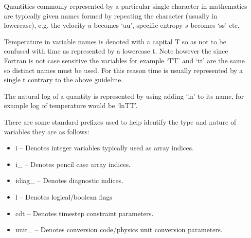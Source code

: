 \documentclass[\mydriver,12pt,twoside,notitlepage,a4paper]{article}
\begin{document}
Quantities commonly represented by a particular single character
in mathematics are typically given names formed by repeating the
character (usually in lowercase), e.g. the velocity $u$ becomes `uu',
specific entropy $s$ becomes `ss' etc.

Temperature in variable names is denoted with a capital T so as not to
be confused with time as represented by a lowercase t.  Note however the
since Fortran is not case sensitive the variables for example `TT' and
`tt' are the same so distinct names must be used. For this reason time is
usually represented by a single t contrary to the above guideline.

The natural log of a quantity is represented by using adding `ln' to its
name, for example log of temperature would be `lnTT'.

There are some standard prefixes used to help identify the type and nature
of variables they are as follows:
\begin{itemize}
\item i -- Denotes integer variables typically used as array indices.
\item i_ -- Denotes pencil case array indices.
\item idiag_ -- Denotes diagnostic indices.
\item l -- Denotes logical/boolean flags
\item cdt -- Denotes timestep constraint parameters.
\item unit_ -- Denotes conversion code/physics unit conversion parameters.
\end{itemize}
\end{document}
